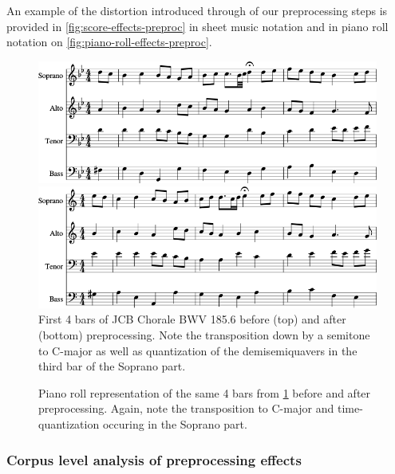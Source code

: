 An example of the distortion introduced through of our preprocessing steps is
provided in \vref{fig:score-effects-preproc} in sheet music notation and in
piano roll notation on \vref{fig:piano-roll-effects-preproc}.
\begin{figure}[p]
    \centering
    \includegraphics[width=0.8\linewidth]{bwv185-6-original-score-1.png}

    \vspace{1.5cm}

    \includegraphics[width=0.8\linewidth]{bwv185-6-preproc-score-1.png}
    \caption{First 4 bars of JCB Chorale BWV 185.6 before (top) and after
      (bottom) preprocessing. Note the transposition down by a semitone to
      C-major as well as quantization of the demisemiquavers in the third bar of
    the Soprano part.}
    \label{fig:score-effects-preproc}
\end{figure}

\begin{figure}[p]
    \centering
        
        
    \caption{Piano roll representation of the same 4 bars from \cref{fig:score-effects-preproc}
      before and after preprocessing. Again, note the transposition to C-major
      and time-quantization occuring in the Soprano part.}
    \label{fig:piano-roll-effects-preproc}
\end{figure}

\subsubsection{Corpus level analysis of preprocessing effects}

